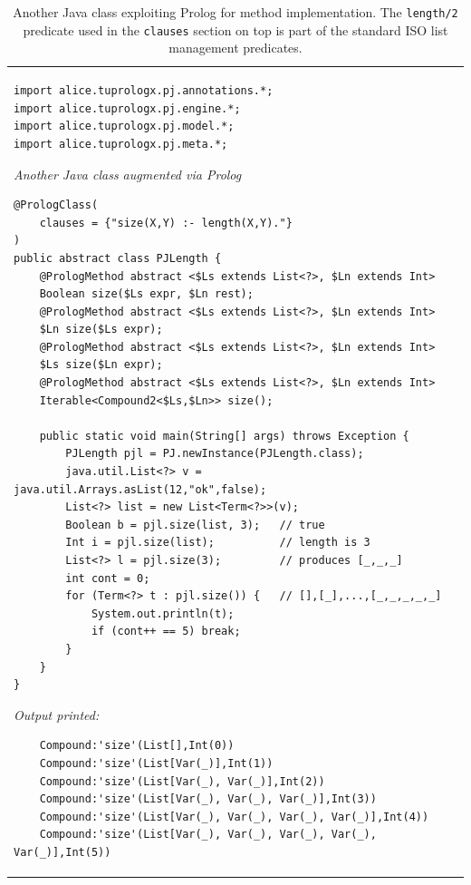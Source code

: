 \begin{table}
{\footnotesize
\begin{tabular}[-1cm]{p{12cm}}
\begin{verbatim}
import alice.tuprologx.pj.annotations.*;
import alice.tuprologx.pj.engine.*;
import alice.tuprologx.pj.model.*;
import alice.tuprologx.pj.meta.*;
\end{verbatim}
\textsf{\emph{Another Java class augmented via Prolog}}
\begin{verbatim}
@PrologClass(
	clauses = {"size(X,Y) :- length(X,Y)."}
)
public abstract class PJLength {	
    @PrologMethod abstract <$Ls extends List<?>, $Ln extends Int>
    Boolean size($Ls expr, $Ln rest);
    @PrologMethod abstract <$Ls extends List<?>, $Ln extends Int>
    $Ln size($Ls expr);
    @PrologMethod abstract <$Ls extends List<?>, $Ln extends Int>
    $Ls size($Ln expr);
    @PrologMethod abstract <$Ls extends List<?>, $Ln extends Int>
    Iterable<Compound2<$Ls,$Ln>> size();

    public static void main(String[] args) throws Exception {
        PJLength pjl = PJ.newInstance(PJLength.class);
        java.util.List<?> v = java.util.Arrays.asList(12,"ok",false);
        List<?> list = new List<Term<?>>(v);
        Boolean b = pjl.size(list, 3);   // true
        Int i = pjl.size(list);          // length is 3
        List<?> l = pjl.size(3);         // produces [_,_,_]
        int cont = 0;
        for (Term<?> t : pjl.size()) {   // [],[_],...,[_,_,_,_,_]
            System.out.println(t);
            if (cont++ == 5) break;
        }
    }
}\end{verbatim}
\textsf{\emph{Output printed:}}
\begin{verbatim}
    Compound:'size'(List[],Int(0))
    Compound:'size'(List[Var(_)],Int(1))
    Compound:'size'(List[Var(_), Var(_)],Int(2))
    Compound:'size'(List[Var(_), Var(_), Var(_)],Int(3))
    Compound:'size'(List[Var(_), Var(_), Var(_), Var(_)],Int(4))
    Compound:'size'(List[Var(_), Var(_), Var(_), Var(_), Var(_)],Int(5))
\end{verbatim}
\end{tabular}
}\caption{Another Java class exploiting Prolog for method implementation. The \texttt{length/2} predicate used in the \texttt{clauses} section on top is part of the standard ISO list management predicates.}
\label{tab:pj-example2}
\end{table}

